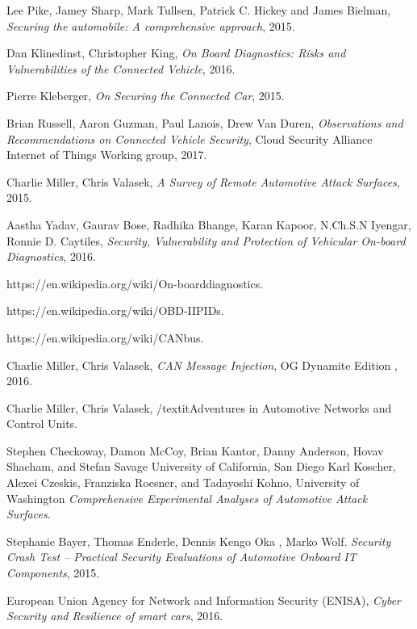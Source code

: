 \documentclass[11pt]{article}
\begin{document}
\begin{thebibliography}{10}
	
	Lee Pike, Jamey Sharp, Mark Tullsen, Patrick C. Hickey and James Bielman, \textit{Securing the automobile: A comprehensive approach}, 2015.
	
	Dan Klinedinst, Christopher King, 
	\textit{On Board Diagnostics: Risks and Vulnerabilities of the Connected Vehicle}, 2016.
	
	Pierre Kleberger, \textit{On Securing the Connected Car},
	2015.
	
	Brian Russell, Aaron Guzman, Paul Lanois, Drew Van Duren,
	\textit{Observations and Recommendations on Connected Vehicle Security},
	Cloud Security Alliance Internet of Things Working group, 2017.
	
	Charlie Miller, Chris Valasek,
	\textit{A Survey of Remote Automotive Attack Surfaces}, 2015.
	
	Aastha Yadav, Gaurav Bose, Radhika Bhange, Karan Kapoor, N.Ch.S.N Iyengar, Ronnie D. Caytiles, \textit{Security, Vulnerability and Protection of Vehicular On-board Diagnostics}, 2016.
	
	https://en.wikipedia.org/wiki/On-board\textunderscore diagnostics.
	
	https://en.wikipedia.org/wiki/OBD-II\textunderscore PIDs.
	
	https://en.wikipedia.org/wiki/CAN\textunderscore bus.
	
	Charlie Miller, Chris Valasek,
	\textit{CAN Message Injection},
	OG Dynamite Edition
	, 2016.
	
	Charlie Miller, Chris Valasek,
	/textit{Adventures in Automotive Networks and Control Units}.
	
	Stephen Checkoway, Damon McCoy, Brian Kantor, Danny Anderson, Hovav Shacham, and Stefan Savage University of California, San Diego
	Karl Koscher, Alexei Czeskis, Franziska Roesner, and Tadayoshi Kohno,
	University of Washington
	\textit{Comprehensive Experimental Analyses of Automotive Attack Surfaces}.
	
	Stephanie Bayer, Thomas Enderle, Dennis Kengo Oka , Marko Wolf.
	\textit{Security Crash Test – Practical Security Evaluations of Automotive Onboard IT Components}, 2015.
	
	European Union Agency for Network and Information Security (ENISA),
	\textit{Cyber Security and Resilience of smart cars},
	2016.

	
\end{thebibliography}
\end{document}
